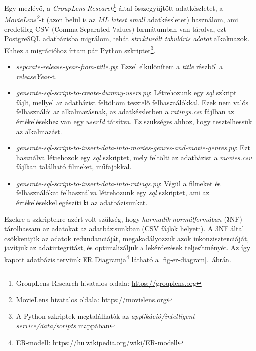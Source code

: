 \documentclass[
]{thesis-ekf}
\theoremstyle{definition}
\theoremstyle{remark}
\begin{document}
Egy meglévő, a \emph{GroupLens Research}\footnote{GroupLens Research hivatalos oldala: \url{https://grouplens.org}} által összegyűjtött adatkészletet, a \emph{MovieLens\footnote{MovieLens hivatalos oldala: \url{https://movielens.org}}}-t (azon belül is az \emph{ML latest small} adatkészletet) használom, ami eredetileg CSV (Comma-Separated Values) formátumban van tárolva, ezt PostgreSQL adatbázisba migrálom, tehát \emph{strukturált tabuláris adatot} alkalmazok. Ehhez a migrációhoz írtam pár Python szkriptet\footnote{A Python szkriptek megtalálhatók az \emph{applikáció/intelligent-service/data/scripts} mappában}.
\begin{itemize}
	\item \emph{separate-release-year-from-title.py}: Ezzel elkülönítem a \emph{title} részből a \emph{releaseYear}-t.
	\item \emph{generate-sql-script-to-create-dummy-users.py}: Létrehozunk egy \emph{sql} szkript fájlt, mellyel az adatbázist feltöltöm tesztelő felhasználókkal. Ezek nem valós felhasználói az alkalmazásnak, az adatkészletben a \emph{ratings.csv} fájlban az értékelésekhez van egy \emph{userId} társítva. Ez szükséges ahhoz, hogy tesztelhessük az alkalmazást.
	\item \emph{generate-sql-script-to-insert-data-into-movies-genres-and-movie-genres.py}: Ezt használva létrehozok egy \emph{sql} szkriptet, mely feltölti az adatbázist a \emph{movies.csv} fájlban található filmeket, műfajokkal.
	\item \emph{generate-sql-script-to-insert-data-into-ratings.py}: Végül a filmeket és felhasználókat felhasználva létrehozunk egy \emph{sql} szkriptet, ami az értékelésekkel egészíti ki az adatbázisunkat.
\end{itemize}

Ezekre a szkriptekre azért volt szükség, hogy \emph{harmadik normálformában} (3NF) tárolhassam az adatokat az adatbázisunkban (CSV fájlok helyett). A 3NF által csökkentjük az adatok redundanciáját, megakadályozzuk azok inkonzisztenciáját, javítjuk az adatintegritást, és optimalizáljuk a lekérdezések teljesítményét. Az így kapott adatbázis tervünk ER Diagramja\footnote{ER-modell: \url{https://hu.wikipedia.org/wiki/ER-modell}} látható a \ref{fig-er-diagram}.~ábrán.
\end{document}
